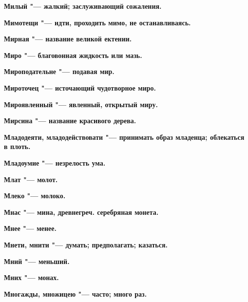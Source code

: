\begin{mymulticols}{2}
\bfseries Милый\normalfont{} "--- жалкий; заслуживающий сожаления. 




\bfseries Мимотещи\normalfont{} "--- идти, проходить мимо, не останавливаясь. 




\bfseries Мирная\normalfont{} "--- название великой ектении. 




\bfseries Миро\normalfont{} "--- благовонная жидкость или мазь. 




\bfseries Мироподательне\normalfont{} "--- подавая мир. 




\bfseries Мироточец\normalfont{} "--- источающий чудотворное миро. 




\bfseries Мироявленный\normalfont{} "--- явленный, открытый миру. 




\bfseries Мирсина\normalfont{} "--- название красивого дерева. 




\bfseries Младодеяти, младодействовати\normalfont{} "--- принимать образ младенца; облекаться в плоть. 




\bfseries Младоумие\normalfont{} "--- незрелость ума. 




\bfseries Млат\normalfont{} "--- молот. 




\bfseries Млеко\normalfont{} "--- молоко. 




\bfseries Мнас\normalfont{} "--- мина, древнегреч. серебряная монета. 




\bfseries Мнее\normalfont{} "--- менее. 




\bfseries Мнети, мнити\normalfont{} "--- думать; предполагать; казаться. 




\bfseries Мний\normalfont{} "--- меньший. 




\bfseries Мних\normalfont{} "--- монах. 




\bfseries Многажды, множицею\normalfont{} "--- часто; много раз. 





\end{mymulticols}
